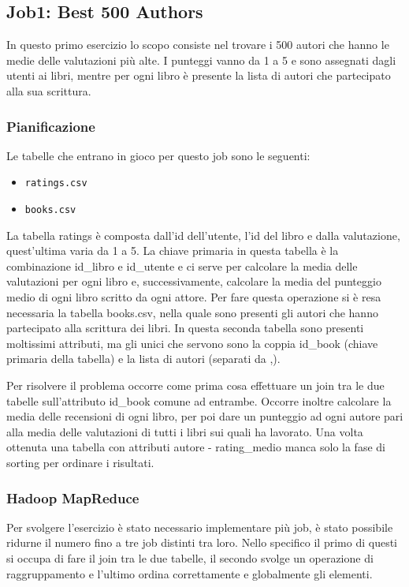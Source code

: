 \subsection{Job1: Best 500 Authors}

In questo primo esercizio lo scopo consiste nel trovare i 500 autori che hanno le medie delle valutazioni più alte.
I punteggi vanno da 1 a 5 e sono assegnati dagli utenti ai libri, mentre per ogni libro è presente la lista di autori che
partecipato alla sua scrittura.

\subsubsection{Pianificazione}
Le tabelle che entrano in gioco per questo job sono le seguenti:
\begin{itemize}
    \item \texttt{ratings.csv}
    \item \texttt{books.csv}
\end{itemize}

La tabella ratings è composta dall'id dell'utente, l'id del libro e dalla valutazione, quest'ultima varia da 1 a 5.
La chiave primaria in questa tabella è la combinazione id\_libro e id\_utente e ci serve per calcolare la media delle
valutazioni per ogni libro e, successivamente, calcolare la media del punteggio medio di ogni libro scritto da ogni attore.
Per fare questa operazione si è resa necessaria la tabella books.csv, nella quale sono presenti gli autori che hanno
partecipato alla scrittura dei libri.
In questa seconda tabella sono presenti moltissimi attributi, ma gli unici che servono sono la coppia id\_book
(chiave primaria della tabella) e la lista di autori (separati da ,).

Per risolvere il problema occorre come prima cosa effettuare un join tra le due tabelle sull'attributo id\_book comune ad entrambe.
Occorre inoltre calcolare la media delle recensioni di ogni libro, per poi dare un punteggio ad ogni autore pari alla media delle
valutazioni di tutti i libri sui quali ha lavorato.
Una volta ottenuta una tabella con attributi autore - rating\_medio manca solo la fase di sorting per ordinare i risultati.

\subsubsection{Hadoop MapReduce}
Per svolgere l'esercizio è stato necessario implementare più job, è stato possibile ridurne il numero fino a tre job distinti tra loro.
Nello specifico il primo di questi si occupa di fare il join tra le due tabelle, il secondo svolge un operazione di raggruppamento e l'ultimo
ordina correttamente e globalmente gli elementi.

